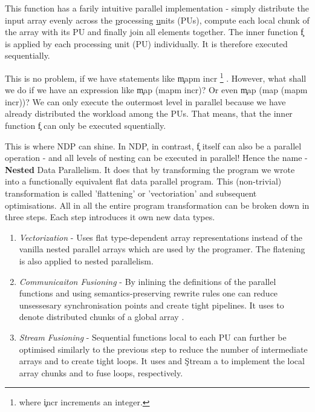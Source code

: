     This function has a farily intuitive parallel implementation -
    simply distribute the input array evenly across the \underline{p}rocessing \underline{u}nits (PUs),
    compute each local chunk of the array with its PU and finally
    join all elements together.
    The inner function \c{f} is applied by each processing unit (PU) individually.
    It is therefore executed sequentially.
    
    This is no problem, if we have statements like \c{mapm incr}
    \footnote{where \c{incr} increments an integer.}
    . However, what shall we do if we have an expression like \c{map (mapm incr)}?
    Or even \c{map (map (mapm incr))}?
    We can only execute the outermost level in parallel because we have already
    distributed the workload among the PUs.
    That means, that the inner function \c{f} can only be executed squentially.
    
    
    This is where NDP can shine. In NDP, in contrast, \c{f} itself can
    also be a parallel operation - and all levels of nesting can
    be executed in parallel! Hence the name - \textbf{Nested} Data Parallelism.
    It does that by transforming the program we wrote into a functionally
    equivalent flat data parallel program. This (non-trivial) transformation
    is called 'flattening' or 'vectoriation' and subsequent optimisations.
    All in all the entire program transformation can be broken down in three steps.
    Each step introduces it own new data types.
    \begin{enumerate}
      \item \emph{Vectorization} -
        Uses flat type-dependent array \pav representations instead of the
        vanilla nested parallel arrays \pan which are used by the programer.
        The flatening is also applied to nested parallelism.
      \item \emph{Communicaiton Fusioning} -
        By inlining the definitions of the parallel functions and
        using semantics-preserving rewrite rules one can
        reduce unsessesary synchronisation points and
        create tight pipelines. It uses \pad to denote
        distributed chunks of a global array \pav.
      \item \emph{Stream Fusioning} -
        Sequential functions local to each PU can further
        be optimised similarly to the previous step
        to reduce the number of intermediate arrays and
        to create tight loops.
        It uses  and \c{Stream a} to
        implement the local array chunks and to fuse loops, respectively.
    \end{enumerate}
    
